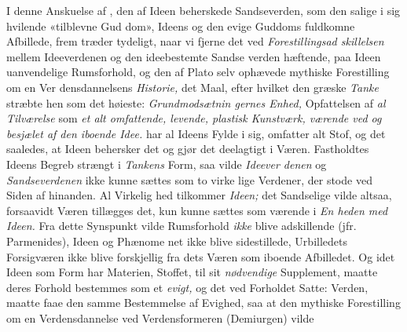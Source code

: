 I denne Anskuelse af , den af Ideen beherskede
Sandseverden, som den salige i sig hvilende «tilblevne Gud\-%
dom», Ideens og den evige Guddoms fuldkomne Afbillede, frem\-%
træder tydeligt, naar vi fjerne det ved \emph{Forestillingsad\-%
skillelsen} mellem Ideeverdenen og den ideebestemte Sandse\-%
verden hæftende, paa Ideen uanvendelige Rumsforhold, og
den af Plato selv ophævede mythiske Forestilling om en Ver\-%
densdannelsens \emph{Historie,} det Maal, efter hvilket den græske
\emph{Tanke} stræbte hen som det høieste: \emph{Grundmodsætnin\-%
gernes Enhed,} Opfattelsen af \emph{al Tilværelse} som \emph{et alt\-%
omfattende, levende, plastisk Kunstværk, værende
ved og besjælet af den iboende Idee.}  har al
Ideens Fylde i sig, omfatter alt Stof, og det saaledes, at Ideen
behersker det og gjør det deelagtigt i Væren. Fastholdtes
Ideens Begreb strængt i \emph{Tankens} Form, saa vilde \emph{Ideever\-%
denen} og \emph{Sandseverdenen} ikke kunne sættes som to virke\-%
lige Verdener, der stode ved Siden af hinanden. Al Virkelig\-%
hed tilkommer \emph{Ideen;} det Sandselige vilde altsaa, forsaavidt
Væren tillægges det, kun kunne sættes som værende i \emph{En\-%
heden med Ideen.} Fra dette Synspunkt vilde Rumsforhold
\emph{ikke} blive adskillende (jfr. Parmenides), Ideen og Phænome\-%
net ikke blive sidestillede, Urbilledets Forsigværen ikke blive
forskjellig fra dets Væren som iboende Afbilledet. Og idet
Ideen som Form har Materien, Stoffet, til sit \emph{nødvendige}
Supplement, maatte deres Forhold bestemmes som et \emph{evigt,}
og det ved Forholdet Satte: Verden, maatte faae den samme
Bestemmelse af Evighed, saa at den mythiske Forestilling om
en Verdensdannelse ved Verdensformeren (Demiurgen) vilde
